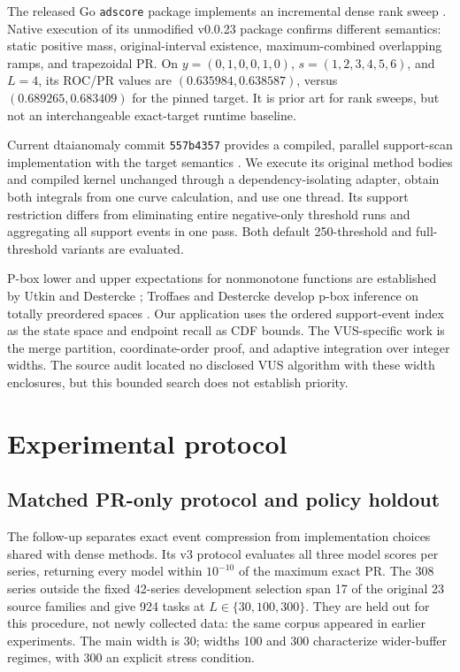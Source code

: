 \documentclass[10pt]{article}
\begin{document}
The released Go \texttt{adscore} package implements an incremental dense rank
sweep \cite{boxer}. Native execution of its unmodified v0.0.23 package confirms
different semantics: static positive mass, original-interval existence,
maximum-combined overlapping ramps, and trapezoidal PR. On
$y=(0,1,0,0,1,0)$, $s=(1,2,3,4,5,6)$, and $L=4$, its ROC/PR values are
$(0.635984,0.638587)$, versus $(0.689265,0.683409)$ for the pinned target.
It is prior art for rank sweeps, but not an interchangeable exact-target
runtime baseline.

Current dtaianomaly commit \texttt{557b4357} provides a compiled, parallel
support-scan implementation with the target semantics \cite{dtaianomaly}.
We execute its original method bodies and compiled kernel unchanged through a
dependency-isolating adapter, obtain both integrals from one curve calculation,
and use one thread. Its support restriction differs from eliminating entire
negative-only threshold runs and aggregating all support events in one pass.
Both default 250-threshold and full-threshold variants are evaluated.

P-box lower and upper expectations for nonmonotone functions are established
by Utkin and Destercke \cite{utkin2009}; Troffaes and Destercke develop p-box
inference on totally preordered spaces \cite{troffaes2011}.
Our application uses the ordered support-event index as the state space and
endpoint recall as CDF bounds. The VUS-specific work is the merge partition,
coordinate-order proof, and adaptive integration over integer widths.
The source audit located no disclosed VUS algorithm with these width
enclosures, but this bounded search does not establish priority.

\section{Experimental protocol}
\subsection{Matched PR-only protocol and policy holdout}
The follow-up separates exact event compression from implementation choices
shared with dense methods. Its v3 protocol evaluates all three model scores
per series, returning every model within $10^{-10}$ of the maximum exact PR.
The 308 series outside the fixed 42-series development selection span 17 of
the original 23 source families and give 924 tasks at $L\in\{30,100,300\}$.
They are held out for this procedure, not newly
collected data: the same corpus appeared in earlier experiments. The main
width is 30; widths 100 and 300 characterize wider-buffer regimes, with 300
an explicit stress condition.
\end{document}
